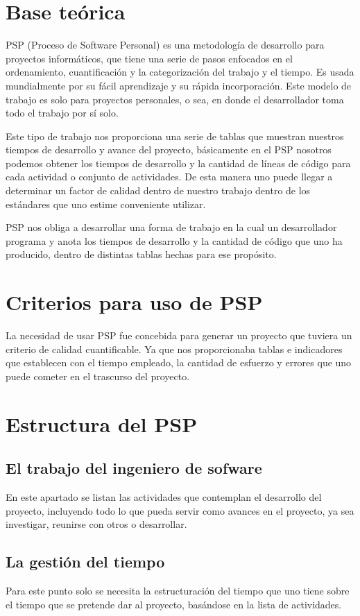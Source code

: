 \documentclass[a4paper,12pt,openany,oneside]{book}
\begin{document}
\section{Base teórica}
PSP (Proceso de Software Personal) es una metodología de desarrollo para proyectos informáticos, que tiene una serie de pasos enfocados en el ordenamiento, cuantificación y la categorización del trabajo y el tiempo. Es usada mundialmente por su fácil aprendizaje y su rápida incorporación. Este modelo de trabajo es solo para proyectos personales, o sea, en donde el desarrollador toma todo el trabajo por sí solo.

Este tipo de trabajo nos proporciona una serie de tablas que muestran nuestros tiempos de desarrollo y avance del proyecto, básicamente en el PSP nosotros podemos obtener los tiempos de desarrollo y la cantidad de líneas de código para cada actividad o conjunto de actividades. De esta manera uno puede llegar a determinar un factor de calidad dentro de nuestro trabajo dentro de los estándares que uno estime conveniente utilizar.

PSP nos obliga a desarrollar una forma de trabajo en la cual un desarrollador programa y anota los tiempos de desarrollo y la cantidad de código que uno ha producido, dentro de distintas tablas hechas para ese propósito.

\section{Criterios para uso de PSP}
La necesidad de usar PSP fue concebida para generar un proyecto que tuviera un criterio de calidad cuantificable. Ya que nos proporcionaba tablas e indicadores que establecen con el tiempo empleado, la cantidad de esfuerzo y errores que uno puede cometer en el trascurso del proyecto.

\section{Estructura del PSP}
\subsection{El trabajo del ingeniero de sofware}
En este apartado se listan las actividades que contemplan el desarrollo del proyecto, incluyendo todo lo que pueda servir como avances en el proyecto, ya sea investigar, reunirse con otros o desarrollar.
\subsection{La gestión del tiempo}
Para este punto solo se necesita la estructuración del tiempo que uno tiene sobre el tiempo que se pretende dar al proyecto, basándose en la lista de actividades.
\end{document}
